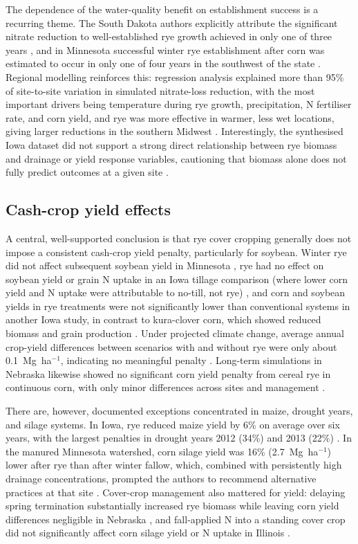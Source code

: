 The dependence of the water-quality benefit on establishment success is a recurring theme. The South Dakota authors explicitly attribute the significant nitrate reduction to well-established rye growth achieved in only one of three years \parencite{Bawa2023}, and in Minnesota successful winter rye establishment after corn was estimated to occur in only one of four years in the southwest of the state \parencite{Strock2004}. Regional modelling reinforces this: regression analysis explained more than 95\% of site-to-site variation in simulated nitrate-loss reduction, with the most important drivers being temperature during rye growth, precipitation, N fertiliser rate, and corn yield, and rye was more effective in warmer, less wet locations, giving larger reductions in the southern Midwest \parencite{Malone2014b}. Interestingly, the synthesised Iowa dataset did not support a strong direct relationship between rye biomass and drainage or yield response variables, cautioning that biomass alone does not fully predict outcomes at a given site \parencite{MartinezFeria2016}.

\subsection{Cash-crop yield effects}
A central, well-supported conclusion is that rye cover cropping generally does not impose a consistent cash-crop yield penalty, particularly for soybean. Winter rye did not affect subsequent soybean yield in Minnesota \parencite{Strock2004}, rye had no effect on soybean yield or grain N uptake in an Iowa tillage comparison (where lower corn yield and N uptake were attributable to no-till, not rye) \parencite{Waring2020}, and corn and soybean yields in rye treatments were not significantly lower than conventional systems in another Iowa study, in contrast to kura-clover corn, which showed reduced biomass and grain production \parencite{Qi2011b}. Under projected climate change, average annual crop-yield differences between scenarios with and without rye were only about 0.1~Mg~ha$^{-1}$, indicating no meaningful penalty \parencite{Malone2020}. Long-term simulations in Nebraska likewise showed no significant corn yield penalty from cereal rye in continuous corn, with only minor differences across sites and management \parencite{Birru2023}.

There are, however, documented exceptions concentrated in maize, drought years, and silage systems. In Iowa, rye reduced maize yield by 6\% on average over six years, with the largest penalties in drought years 2012 (34\%) and 2013 (22\%) \parencite{MartinezFeria2016}. In the manured Minnesota watershed, corn silage yield was 16\% (2.7~Mg~ha$^{-1}$) lower after rye than after winter fallow, which, combined with persistently high drainage concentrations, prompted the authors to recommend alternative practices at that site \parencite{Krueger2013}. Cover-crop management also mattered for yield: delaying spring termination substantially increased rye biomass while leaving corn yield differences negligible in Nebraska \parencite{Birru2023}, and fall-applied N into a standing cover crop did not significantly affect corn silage yield or N uptake in Illinois \parencite{Lacey2015}.

